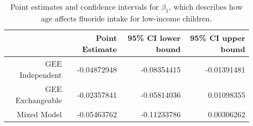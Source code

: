 \begin{table}[ht]
\centering
\begingroup\small
\begin{tabular}{rrrr}
  \toprule
 & Point Estimate & 95\% CI lower bound & 95\% CI upper bound \\ 
  \midrule
GEE Independent & -0.04872948 & -0.08354415 & -0.01391481 \\ 
  GEE Exchangeable & -0.02357841 & -0.05814036 & 0.01098355 \\ 
  Mixed Model & -0.05463762 & -0.11233786 & 0.00306262 \\ 
   \bottomrule
\end{tabular}
\endgroup
\caption{Point estimates and confidence intervals for $\beta_1$, which describes how age affects fluoride intake for low-income children.} 
\label{tab:beta_1_intervals}
\end{table}
